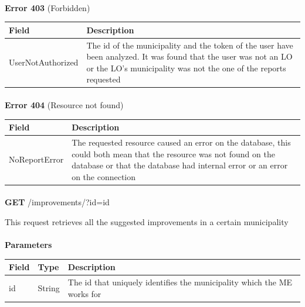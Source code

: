 						\paragraph{}
							\textbf{Error 403} (Forbidden)
							\begin{table}[!h]
								\begin{tabular}{L{0.4\textwidth}L{0.4\textwidth}}
									\toprule
									Field & Description \\
									\midrule
								  	UserNotAuthorized & The id of the municipality and the token of the user have been analyzed. It was found that the user was not an LO or the LO's  municipality was not the one of the reports requested  \\
								 	\bottomrule
								\end{tabular}
							\end{table}
						\paragraph{}
							\textbf{Error 404} (Resource not found)
							\begin{table}[!h]
								\begin{tabular}{L{0.4\textwidth}L{0.4\textwidth}}
									\toprule
									Field & Description \\
									\midrule
								  	 NoReportError & The requested resource caused an error on the database, this could both mean that the resource was not found on the database or that the database had internal error or an error on the connection \\ 
								 	\bottomrule
								\end{tabular}
							\end{table}
							
						\paragraph{}
						\textbf{GET} /improvements/?id={id}
						
						This request retrieves all the suggested improvements in a certain municipality
						\paragraph{}
							\textbf{Parameters}
							\begin{table}[!h]
								\begin{tabular}{L{0.2\textwidth}L{0.2\textwidth}L{0.4\textwidth}}
									\toprule
									Field & Type & Description \\
									\midrule
								 	id & String & The id that uniquely identifies the municipality which the ME works for \\
								 	\bottomrule
								\end{tabular}
							\end{table}
